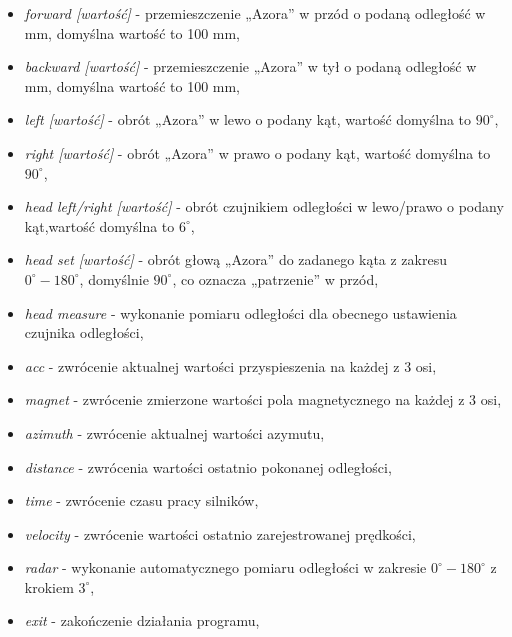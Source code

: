         \begin{itemize}
            \item \textit{forward [wartość]}            - przemieszczenie „Azora” w przód o podaną odległość w mm, domyślna wartość to 100 mm,
            \item \textit{backward [wartość]}           - przemieszczenie „Azora” w tył o podaną odległość w mm, domyślna wartość to 100 mm,
            \item \textit{left [wartość]}               - obrót „Azora” w lewo o podany kąt, wartość domyślna to $90^\circ$,
            \item \textit{right [wartość]}              - obrót „Azora” w prawo o podany kąt, wartość domyślna to $90^\circ$,
            \item \textit{head left/right [wartość]}    - obrót czujnikiem odległości w lewo/prawo o podany kąt,wartość domyślna to $6^\circ$,
            \item \textit{head set [wartość]}           - obrót głową „Azora” do zadanego kąta z zakresu $0^\circ-180^\circ$, domyślnie $90^\circ$, co oznacza „patrzenie” w przód,
            \item \textit{head measure}                 - wykonanie pomiaru odległości dla obecnego ustawienia czujnika odległości,
            \item \textit{acc}                          - zwrócenie aktualnej wartości przyspieszenia na każdej z 3 osi,
            \item \textit{magnet}                       - zwrócenie zmierzone wartości pola magnetycznego na każdej z 3 osi,
            \item \textit{azimuth}                      - zwrócenie aktualnej wartości azymutu,
            \item \textit{distance}                     - zwrócenia wartości ostatnio pokonanej odległości,
            \item \textit{time}                         - zwrócenie czasu pracy silników,
            \item \textit{velocity}                     - zwrócenie wartości ostatnio zarejestrowanej prędkości,
            \item \textit{radar}                        - wykonanie automatycznego pomiaru odległości w zakresie $0^\circ-180^\circ$ z krokiem $3^\circ$,
            \item \textit{exit}                         - zakończenie działania programu,
        \end{itemize}
    
